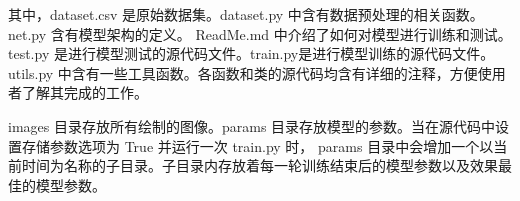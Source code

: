 \documentclass[supercite]{Experimental_Report}
\theoremstyle{definition}
\begin{document}
其中，dataset.csv 是原始数据集。dataset.py 中含有数据预处理的相关函数。net.py 含有模型架构的定义。
ReadMe.md 中介绍了如何对模型进行训练和测试。test.py 是进行模型测试的源代码文件。train.py是进行模型训练的源代码文件。
utils.py 中含有一些工具函数。各函数和类的源代码均含有详细的注释，方便使用者了解其完成的工作。

images 目录存放所有绘制的图像。params 目录存放模型的参数。当在源代码中设置存储参数选项为 True 并运行一次 train.py 时，
params 目录中会增加一个以当前时间为名称的子目录。子目录内存放着每一轮训练结束后的模型参数以及效果最佳的模型参数。
\end{document}
